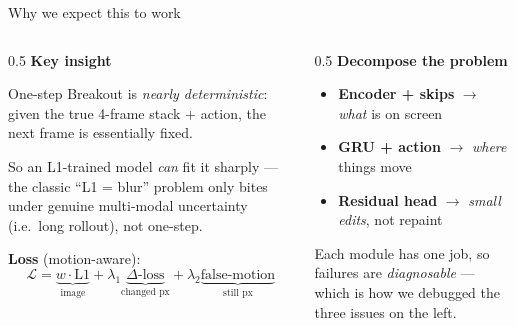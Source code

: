 \documentclass[aspectratio=169]{beamer}
\begin{document}
\begin{frame}{Why we expect this to work}
  \begin{columns}
    \begin{column}{0.5\textwidth}
      \textbf{Key insight}

      One-step Breakout is \emph{nearly deterministic}: given the true 4-frame
      stack + action, the next frame is essentially fixed.

      \vspace{0.4em}
      So an L1-trained model \emph{can} fit it sharply --- the classic
      ``L1 = blur'' problem only bites under genuine multi-modal uncertainty
      (i.e.\ long rollout), not one-step.

      \vspace{0.4em}
      \textbf{Loss} (motion-aware):
      \[
        \mathcal{L} = \underbrace{w\!\cdot\!\text{L1}}_{\text{image}}
        + \lambda_1 \underbrace{\Delta\text{-loss}}_{\text{changed px}}
        + \lambda_2 \underbrace{\text{false-motion}}_{\text{still px}}
      \]
    \end{column}
    \begin{column}{0.5\textwidth}
      \textbf{Decompose the problem}
      \begin{itemize}
        \item \textbf{Encoder + skips} $\to$ \emph{what} is on screen
        \item \textbf{GRU + action} $\to$ \emph{where} things move
        \item \textbf{Residual head} $\to$ \emph{small edits}, not repaint
      \end{itemize}

      \vspace{0.6em}
      Each module has one job, so failures are \emph{diagnosable} --- which is how
      we debugged the three issues on the left.
    \end{column}
  \end{columns}
\end{frame}
\end{document}
